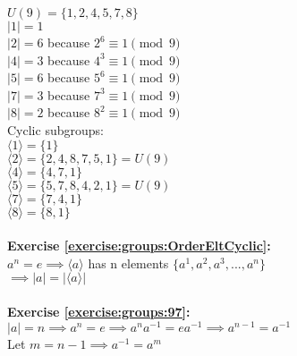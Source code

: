 $U(9)=\{1,2,4,5,7,8\}$\\
$|1|=1$\\
$|2|=6$ because $2^6\equiv 1\pmod{9}$\\
$|4|=3$ because $4^3\equiv 1\pmod{9}$\\
$|5|=6$ because $5^6\equiv 1\pmod{9}$\\
$|7|=3$ because $7^3\equiv 1\pmod{9}$\\
$|8|=2$ because $8^2\equiv 1\pmod{9}$\\
Cyclic subgroups:\\
$\langle1\rangle=\{1\}$\\
$\langle2\rangle=\{2,4,8,7,5,1\}=U(9)$\\
$\langle4\rangle=\{4,7,1\}$\\
$\langle5\rangle=\{5,7,8,4,2,1\}=U(9)$\\
$\langle7\rangle=\{7,4,1\}$\\
$\langle8\rangle=\{8,1\}$\\
\\
\textbf{Exercise \ref{exercise:groups:OrderEltCyclic}:}\\
$a^n=e\implies \langle a\rangle$ has n elements $\{a^1,a^2,a^3,...,a^n\}$\\
$\implies |a|=|\langle a\rangle|$\\
\\
\textbf{Exercise \ref{exercise:groups:97}:}\\
$|a|=n\implies a^n=e\implies a^na^{-1}=ea^{-1}\implies a^{n-1}=a^{-1}$\\
Let $m=n-1 \implies a^{-1}=a^m$\\

